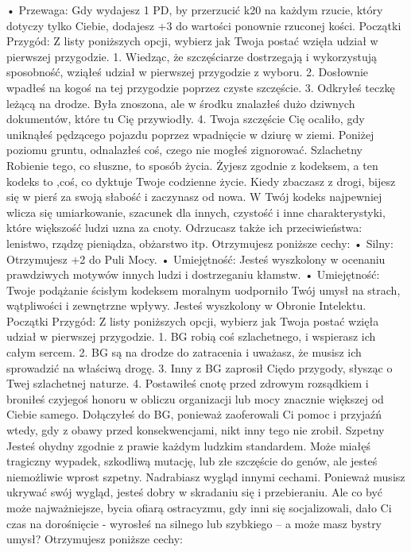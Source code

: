     • Przewaga: Gdy wydajesz 1 PD, by przerzucić k20 na każdym rzucie, który dotyczy tylko Ciebie, dodajesz +3 do wartości ponownie rzuconej kości. 
Początki Przygód: Z listy poniższych opcji, wybierz jak Twoja postać wzięła udział w pierwszej przygodzie.
1. Wiedząc, że szczęściarze dostrzegają i wykorzystują sposobność, wziąłeś udział w pierwszej przygodzie z wyboru. 
2. Dosłownie wpadłeś na kogoś na tej przygodzie poprzez czyste szczęście.
3. Odkryłeś teczkę leżącą na drodze. Była znoszona, ale w  środku znalazłeś dużo dziwnych dokumentów, które tu Cię przywiodły.
4. Twoja szczęście Cię ocaliło, gdy uniknąłeś pędzącego pojazdu poprzez wpadnięcie w dziurę w ziemi. Poniżej poziomu gruntu, odnalazłeś coś, czego nie mogłeś zignorować. 
Szlachetny
Robienie tego, co słuszne, to sposób życia. Żyjesz zgodnie z kodeksem, a ten kodeks to ,coś, co dyktuje Twoje codzienne życie. Kiedy zbaczasz z drogi, bijesz się w pierś za swoją słabość i zaczynasz od nowa. W Twój kodeks najpewniej wlicza się umiarkowanie, szacunek dla innych, czystość i inne charakterystyki, które większość ludzi uzna za cnoty. Odrzucasz także ich przeciwieństwa: lenistwo, rządzę pieniądza, obżarstwo itp.
Otrzymujesz poniższe cechy:
    • Silny: Otrzymujesz +2 do Puli Mocy.
    • Umiejętność: Jesteś wyszkolony w ocenaniu prawdziwych motywów innych ludzi i dostrzeganiu kłamstw.
    • Umiejętność: Twoje podążanie ścisłym kodeksem moralnym uodporniło Twój umysł na strach, wątpliwości i zewnętrzne wpływy. Jesteś wyszkolony w Obronie Intelektu.
Początki Przygód: Z listy poniższych opcji, wybierz jak Twoja postać wzięła udział w pierwszej przygodzie.
1. BG robią coś szlachetnego, i wspierasz ich całym sercem.
2. BG są na drodze do zatracenia i uważasz, że musisz ich sprowadzić na właściwą drogę.
3. Inny z BG zaprosił Ciędo przygody, słysząc o Twej szlachetnej naturze.
4. Postawiłeś cnotę przed zdrowym rozsądkiem i broniłeś czyjegoś honoru w obliczu organizacji lub mocy znacznie większej od Ciebie samego. Dołączyłeś do BG, ponieważ zaoferowali Ci pomoc i przyjaźń wtedy, gdy z obawy przed konsekwencjami, nikt inny tego nie zrobił.
Szpetny
Jesteś ohydny zgodnie z prawie każdym ludzkim standardem. Może miałęś tragiczny wypadek, szkodliwą mutację, lub złe szczęście do genów, ale jesteś niemożliwie wprost szpetny.
Nadrabiasz wygląd innymi cechami. Ponieważ musisz ukrywać swój wygląd, jesteś dobry w skradaniu się i przebieraniu. Ale co być może najważniejsze, bycia ofiarą ostracyzmu, gdy inni się socjalizowali, dało Ci czas na dorośnięcie  - wyrosłeś na silnego lub szybkiego – a może masz bystry umysł? 
Otrzymujesz poniższe cechy:
